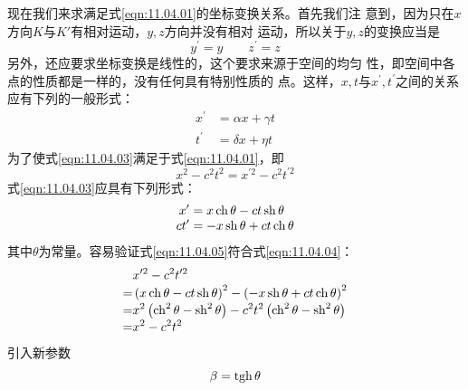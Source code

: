 现在我们来求满足式\eqref{eqn:11.04.01}的坐标变换关系。首先我们注
意到，因为只在$ x $方向$ K $与$ K' $有相对运动，$ y , z $方向并没有相对
运动，所以关于$ y , z $的变换应当是
\begin{equation}\label{eqn:11.04.02}
  y ^ { \prime } = y \qquad z ^ { \prime } = z
\end{equation}
另外，还应要求坐标变换是线性的，这个要求来源于空间的均匀
性，即空间中各点的性质都是一样的，没有任何具有特别性质的
点。这样，$ x, t $与$ x ^ { \prime }, t ^ { \prime } $之间的关系应有下列的一般形式：
\begin{equation}\label{eqn:11.04.03}
  \begin{split}
    x ^ { \prime } &= \alpha x + \gamma t \\[-0.3em]
    t ^ { \prime } &= \delta x + \eta t
  \end{split}
\end{equation}
为了使式\eqref{eqn:11.04.03}满足于式\eqref{eqn:11.04.01}，即
\begin{equation}\label{eqn:11.04.04}
  x ^ { 2 } - c ^ { 2 } t ^ { 2 } = x ^ { \prime 2 } - c ^ { 2 } t ^ { \prime 2 }
\end{equation}
式\eqref{eqn:11.04.03}应具有下列形式：
\begin{equation}\label{eqn:11.04.05}
  \begin{split}
    x ^ { \prime } &= x \operatorname{ch} \theta - c t \operatorname{sh} \theta \\[-0.3em]
    c t ^ { \prime } &= - x \operatorname{sh} \theta + c t \operatorname{ch} \theta
  \end{split}
\end{equation}
其中$\theta$为常量。容易验证式\eqref{eqn:11.04.05}符合式\eqref{eqn:11.04.04}：
\begin{equation*}
  \begin{split}
    &x ^ { \prime 2 } - c ^ { 2 } t ^ { \prime 2 } \\[-0.3em]
    =& \left( x \operatorname{ch} \theta - c t \operatorname{sh} \theta \right) ^ { 2 } - \left( - x \operatorname{sh} \theta + c t \operatorname{ch} \theta \right) ^ { 2 } \\[-0.3em]
    =& x ^ { 2 } \left( \operatorname{ch} ^ { 2 } \theta - \operatorname{sh} ^ { 2 } \theta \right) - c ^ { 2 } t ^ { 2 } \left( \operatorname{ch} ^ { 2 } \theta - \operatorname{sh} ^ { 2 } \theta \right) \\[-0.3em]
    =& x ^ { 2 } - c ^ { 2 } t ^ { 2 }
  \end{split}
\end{equation*}
引入新参数\vspace{-1.8em}
\begin{equation*}
  \beta = \operatorname{tgh} \theta
\end{equation*}

